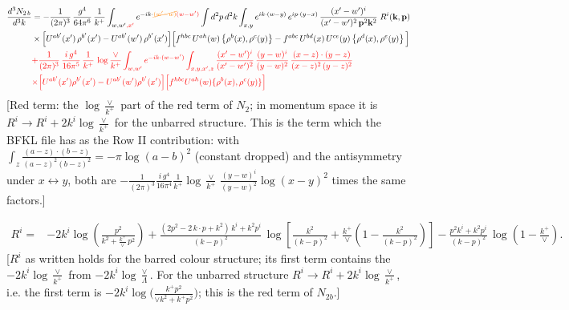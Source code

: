 \documentclass[9pt]{article}
\numberwithin{equation}{section}
\begin{document}
\begin{align}
\frac{d^{3}N_{2\,b}}{d^{3}k} & = -\frac{1}{(2\pi)^{3}}\,\frac{g^{4}}{64\pi^{6}}\,\frac{1}{k^{+}}\int_{w,w'{\color{red},x'}} e^{-ik\cdot{\color{orange}\cancel{(w'-w)}}{\color{red}(w-w')}}
\int d^{2}p\,d^{2}k\int_{x,y} e^{ik\cdot(w-y)}\,e^{ip\cdot(y-x)}\,\frac{(x'-w')^{i}}{(x'-w')^{2}\,\mathbf{p}^{2}\mathbf{k}^{2}}\;R^{i}(\mathbf{k},\mathbf{p})\notag\\
&\times\Big[U^{ab'}(x')\,\rho^{b'}(x')-U^{ab'}(w')\,\rho^{b'}(x')\Big]
\Big[f^{hbc}\,U^{ah}(w)\left\{\rho^{b}(x),\rho^{c}(y)\right\}-f^{abc}\,U^{bd}(x)\,U^{ce}(y)\left\{\rho^{d}(x),\rho^{e}(y)\right\}\Big] \notag\\ & {\color{red}+\frac{1}{(2\pi)^{3}}\,\frac{i\,g^{4}}{16\pi^{5}}\,\frac{1}{k^{+}}\,\log\frac{\vee}{k^{+}}\int_{w,w^{\prime}} e^{-ik\cdot(w-w^{\prime})}\int_{x,y,x^{\prime},z}\frac{(x^{\prime}-w^{\prime})^{i}}{(x^{\prime}-w^{\prime})^{2}}\,\frac{(y-w)^{i}}{(y-w)^{2}}\,\frac{(x-z)\cdot(y-z)}{(x-z)^{2}\,(y-z)^{2}}} \notag\\ & {\color{red}\times\Big[U^{ab^{\prime}}(x^{\prime})\rho^{b^{\prime}}(x^{\prime})-U^{ab^{\prime}}(w^{\prime})\rho^{b^{\prime}}(x^{\prime})\Big]\Big[f^{hbc}U^{ah}(w)\{\rho^{b}(x),\rho^{c}(y)\}\Big]}
\end{align} {\color{red}[Red term: the $\log\frac{\vee}{k^{+}}$ part of the red term of $N_{2}$; in momentum space it is $R^{i}\to R^{i}+2k^{i}\log\frac{\vee}{k^{+}}$ for the unbarred structure. This is the term which the BFKL file has as the Row II contribution: with $\int_{z}\frac{(a-z)\cdot(b-z)}{(a-z)^{2}(b-z)^{2}}=-\pi\log(a-b)^{2}$ (constant dropped) and the antisymmetry under $x\leftrightarrow y$, both are $-\frac{1}{(2\pi)^{3}}\frac{i\,g^{4}}{16\pi^{4}}\frac{1}{k^{+}}\log\frac{\vee}{k^{+}}\,\frac{(y-w)^{i}}{(y-w)^{2}}\log(x-y)^{2}$ times the same factors.]}\par\noindent

\begin{align}
R^{i} =& -2k^{i}\log\left(\frac{p^{2}}{k^{2}+\frac{k^{+}}{\vee}\,p^{2}}\right)
+\frac{(2p^{2}-2\,k\cdot p+k^{2})\,k^{i}+k^{2}p^{i}}{(k-p)^{2}}\,
\log\left[\frac{k^{2}}{(k-p)^{2}}+\frac{k^{+}}{\vee}\left(1-\frac{k^{2}}{(k-p)^{2}}\right)\right]
-\frac{p^{2}k^{i}+k^{2}p^{i}}{(k-p)^{2}}\,\log\left(1-\frac{k^{+}}{\vee}\right).
\end{align} {\color{red}[$R^{i}$ as written holds for the barred colour structure; its first term contains the $-2k^{i}\log\frac{\vee}{k^{+}}$ from $-2k^{i}\log\frac{\vee}{\Lambda}$. For the unbarred structure $R^{i}\to R^{i}+2k^{i}\log\frac{\vee}{k^{+}}$, i.e. the first term is $-2k^{i}\log\Big(\frac{k^{+}p^{2}}{\vee k^{2}+k^{+}p^{2}}\Big)$; this is the red term of $N_{2b}$.]}\par\noindent
\end{document}
